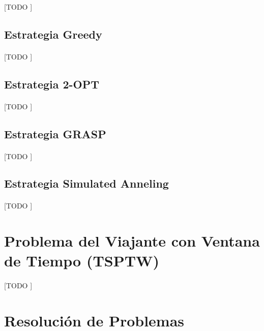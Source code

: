 \documentclass[spanish]{article}
\begin{document}
			\paragraph{}
			[TODO ]

		\subsection{Estrategia Greedy}

			\paragraph{}
			[TODO ]


		\subsection{Estrategia 2-OPT}

			\paragraph{}
			[TODO ]

		\subsection{Estrategia GRASP}

			\paragraph{}
			[TODO ]

		\subsection{Estrategia Simulated Anneling}

			\paragraph{}
			[TODO ]

	\section{Problema del Viajante con Ventana de Tiempo (TSPTW)}

		\paragraph{}
		[TODO ]


	\section{Resolución de Problemas}
\end{document}
